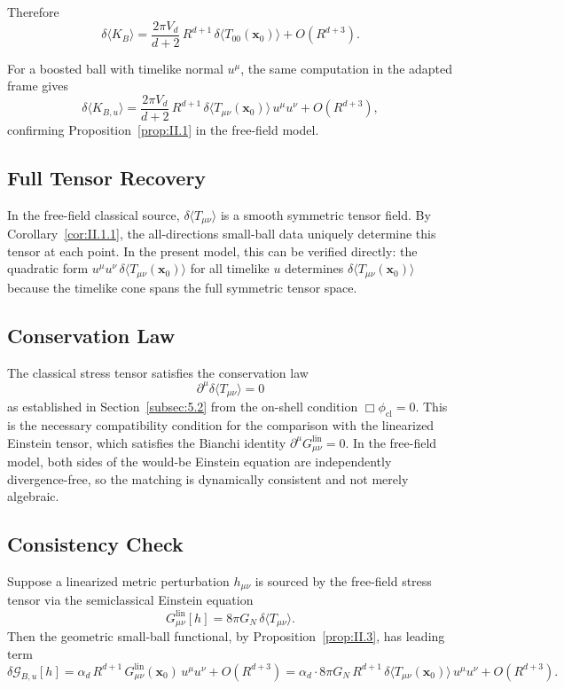 \documentclass[12pt]{article}
\theoremstyle{definition}
\theoremstyle{remark}
\begin{document}
Therefore
\[
\delta\langle K_B\rangle
=
\frac{2\pi V_d}{d+2}\,R^{d+1}\,\delta\langle T_{00}(\mathbf{x}_0)\rangle
+
O(R^{d+3}).
\]

For a boosted ball with timelike normal \(u^\mu\), the same computation in the adapted frame gives
\[
\delta\langle K_{B,u}\rangle
=
\frac{2\pi V_d}{d+2}\,R^{d+1}\,\delta\langle T_{\mu\nu}(\mathbf{x}_0)\rangle\,u^\mu u^\nu
+
O(R^{d+3}),
\]
confirming Proposition~\ref{prop:II.1} in the free-field model.

\subsection{Full Tensor Recovery}\label{subsec:5.4}

In the free-field classical source, \(\delta\langle T_{\mu\nu}\rangle\) is a smooth symmetric tensor field. By Corollary~\ref{cor:II.1.1}, the all-directions small-ball data uniquely determine this tensor at each point. In the present model, this can be verified directly: the quadratic form \(u^\mu u^\nu\,\delta\langle T_{\mu\nu}(\mathbf{x}_0)\rangle\) for all timelike \(u\) determines \(\delta\langle T_{\mu\nu}(\mathbf{x}_0)\rangle\) because the timelike cone spans the full symmetric tensor space.

\subsection{Conservation Law}\label{subsec:5.5}

The classical stress tensor satisfies the conservation law
\[
\partial^\mu\delta\langle T_{\mu\nu}\rangle = 0
\]
as established in Section~\ref{subsec:5.2} from the on-shell condition \(\Box\phi_{\mathrm{cl}} = 0\). This is the necessary compatibility condition for the comparison with the linearized Einstein tensor, which satisfies the Bianchi identity \(\partial^\mu G^{\mathrm{lin}}_{\mu\nu} = 0\). In the free-field model, both sides of the would-be Einstein equation are independently divergence-free, so the matching is dynamically consistent and not merely algebraic.

\subsection{Consistency Check}\label{subsec:5.6}

Suppose a linearized metric perturbation \(h_{\mu\nu}\) is sourced by the free-field stress tensor via the semiclassical Einstein equation
\[
G^{\mathrm{lin}}_{\mu\nu}[h] = 8\pi G_N\,\delta\langle T_{\mu\nu}\rangle.
\]
Then the geometric small-ball functional, by Proposition~\ref{prop:II.3}, has leading term
\[
\delta\mathcal{G}_{B,u}[h]
=
\alpha_d\,R^{d+1}\,G^{\mathrm{lin}}_{\mu\nu}(\mathbf{x}_0)\,u^\mu u^\nu
+
O(R^{d+3})
=
\alpha_d\cdot 8\pi G_N\,R^{d+1}\,\delta\langle T_{\mu\nu}(\mathbf{x}_0)\rangle\,u^\mu u^\nu
+
O(R^{d+3}).
\]
\end{document}
